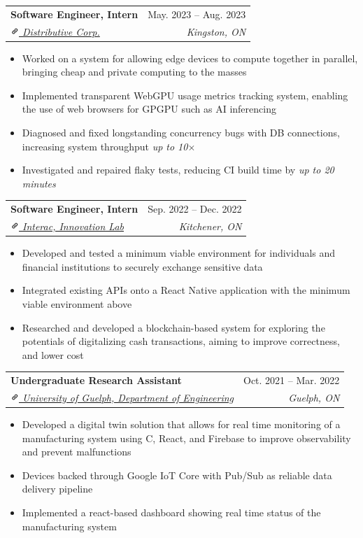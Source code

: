 \documentclass[letterpaper, 10pt]{report}
\makeatletter
\newcommand{\resumeSubheading}[4]{
    \begin{tabular*}{\textwidth}[t]{l@{\extracolsep{\fill}}r}
        \textbf{#1}       & #2                \\
        \textit{\small#3} & \textit{\small#4} \\
    \end{tabular*}\vspace{-0.7em}
}
\newenvironment{ResumeItem}{
    \vspace{-0.3em}
    \begin{itemize}
        \setlength\itemsep{-0.3em}
        }{
    \end{itemize}\vspace{-0.3em}}
\newcommand{\cxx}{C\nolinebreak\hspace{-.05em}\raisebox{0.03ex}{\bf +}\nolinebreak\hspace{-.05em}\raisebox{.03ex}{\bf +}}
\newcommand{\linkIcon}{\includegraphics[height=9pt, trim=0 5cm 0 -1.5cm]{./img/link-icon}}
\makeatother
\begin{document}
\resumeSubheading
{Software Engineer, Intern}{May. 2023 -- Aug. 2023}
{\href{https://distributive.network/}{\linkIcon{} Distributive Corp.}}{Kingston, ON}
\begin{ResumeItem}
    \item{Worked on a system for allowing edge devices to compute together in parallel, bringing cheap and private computing to the masses}
    \item{Implemented transparent WebGPU usage metrics tracking system, enabling the use of web browsers for GPGPU such as AI inferencing}
    \item{Diagnosed and fixed longstanding concurrency bugs with DB connections, increasing system throughput \emph{up to 10\(\times\)}}
    \item{Investigated and repaired flaky tests, reducing CI build time by \emph{up to 20 minutes}}
\end{ResumeItem}

\resumeSubheading
{Software Engineer, Intern}{Sep. 2022 -- Dec. 2022}
{\href{https://www.interac.ca/en/}{\linkIcon{} Interac, Innovation Lab}}{Kitchener, ON}
\begin{ResumeItem}
    \item{Developed and tested a minimum viable environment for individuals and financial institutions to securely exchange sensitive data}
    \item{Integrated existing APIs onto a React Native application with the minimum viable environment above}
    \item{Researched and developed a blockchain-based system for exploring the potentials of digitalizing cash transactions, aiming to improve correctness, and lower cost}
\end{ResumeItem}


\resumeSubheading
{Undergraduate Research Assistant} {Oct. 2021 -- Mar. 2022}
{\href{https://www.uoguelph.ca/engineering/}{\linkIcon{} University of Guelph, Department of Engineering}}{Guelph, ON}

\begin{ResumeItem}
    \item{Developed a digital twin solution that allows for real time monitoring of a manufacturing system using \cxx, React, and Firebase to improve observability and prevent malfunctions}
    \item{Devices backed through Google IoT Core with Pub/Sub as reliable data delivery pipeline}
    \item{Implemented a react-based dashboard showing real time status of the manufacturing system}
\end{ResumeItem}
\end{document}
